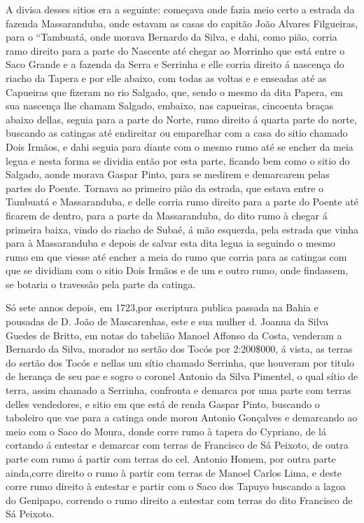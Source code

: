  A divisa desses sitios era a seguinte: começava
 onde fazia meio certo a estrada da fazenda Massaranduba,
 onde estavam as casas do capitão João Alvares Filgueiras\label{filgueiras}, para o “Tambuatá, onde morava Bernardo da Silva, e dahi, como pião, corria ramo direito para a parte do Nascente até chegar ao Morrinho que está entre o Saco Grande e a fazenda da Serra e Serrinha e elle corria direito á nascença do riacho da Tapera
 e por elle abaixo, com todas as voltas e e enseadas até as Capueiras que fizeram no rio Salgado, que, sendo o mesmo da dita Papera, em sua nascença lhe chamam Salgado, embaixo, nas capueiras, cincoenta braças abaixo dellas, seguia para a parte do Norte, rumo direito á quarta parte do norte, buscando as
 catingas até endireitar ou emparelhar com a casa do sitio chamado Dois Irmãos, e dahi seguia para diante com o mesmo rumo até se encher da meia legua e nesta forma se dividia então por esta parte, ficando bem como o sitio do Salgado, aonde morava Gaspar Pinto, para se medirem e demarcarem pelas partes
 do Poente. Tornava ao primeiro pião da estrada, que estava entre o Tambuatá e Massaranduba, e delle corria rumo direito para a parte do Poente até ficarem de dentro, para a parte da Massaranduba, do dito rumo à chegar á primeira baixa, vindo do riacho de Subaé, á mão esquerda, pela estrada que vinha para à Massaranduba e depois de salvar esta dita legua ia seguindo o mesmo rumo em que viesse até encher a meia do rumo que corria para as catingas com que se dividiam com o sitio Dois Irmãos e de um e outro rumo, onde findassem, se botaria o travessão pela parte da catinga.
 
 Só sete annos depois, em 1723,por escriptura publica passada na Bahia e pousadas de D. João de Mascarenhas, este e sua mulher d. Joanna da Silva Guedes de Britto, em notas do tabelião Manoel Affonso da Costa, venderam a Bernardo da Silva, morador no sertão dos Tocós por 2:200\$000, á vista, as terras do sertão dos Tocós e nellas um sítio chamado Serrinha, que houveram por titulo de herança de seu pae e sogro o coronel Antonio da Silva Pimentel, o qual sítio de terra, assim chamado a Serrinha, confronta e demarca por uma parte com terras delles vendedores, e sitio em que está de renda Gaspar Pinto, buscando o taboleiro que vae para a catinga onde morou Antonio Gonçalves e demarcando ao meio com o Saco do Moura, donde corre rumo à tapera do Cypriano, de lá cortando á entestar e demarcar com terras de Francisco de Sá Peixoto, de outra parte com rumo á partir com terras do cel. Antonio Homem, por outra parte ainda,corre direito o rumo à partir com terras de Manoel Carlos Lima, e deste corre rumo direito à entestar e partir com o Saco dos Tapuyo buscando a lagoa do Genipapo, correndo o rumo
 direito a entestar com terras do dito Francisco
 de Sá Peixoto.
 
